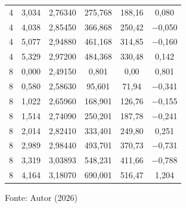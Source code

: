 \begin{apendicesenv}
\begin{table}[H]
\begin{tabular}{cccccc}
        4 & 3{,}034 & 2{,}76340 & 275{,}768 & 188{,}16 & 0{,}080 \\
        4 & 4{,}038 & 2{,}85450 & 366{,}868 & 250{,}42 & $-$0{,}050 \\
        4 & 5{,}077 & 2{,}94880 & 461{,}168 & 314{,}85 & $-$0{,}160 \\
        4 & 5{,}329 & 2{,}97200 & 484{,}368 & 330{,}48 & 0{,}142 \\
        \midrule
        8 & 0{,}000 & 2{,}49150 & 0{,}801 & 0{,}00 & 0{,}801 \\
        8 & 0{,}580 & 2{,}58630 & 95{,}601 & 71{,}94 & $-$0{,}341 \\
        8 & 1{,}022 & 2{,}65960 & 168{,}901 & 126{,}76 & $-$0{,}155 \\
        8 & 1{,}514 & 2{,}74090 & 250{,}201 & 187{,}78 & $-$0{,}241 \\
        8 & 2{,}014 & 2{,}82410 & 333{,}401 & 249{,}80 & 0{,}251 \\
        8 & 2{,}989 & 2{,}98440 & 493{,}701 & 370{,}73 & $-$0{,}731 \\
        8 & 3{,}319 & 3{,}03893 & 548{,}231 & 411{,}66 & $-$0{,}788 \\
        8 & 4{,}164 & 3{,}18070 & 690{,}001 & 516{,}47 & 1{,}204 \\
        \bottomrule
    \end{tabular}

    \vspace{2pt}
    {\small Fonte: Autor (2026)}
\end{table}



\end{apendicesenv}
